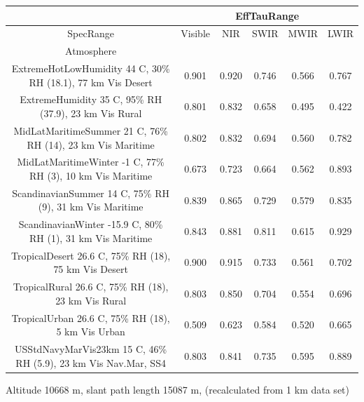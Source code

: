 \documentclass{workpackage}
\begin{document}
\begin{center}

\begin{footnotesize}

\begin{tabular}{|c|c|c|c|c|c|}
\hline
&\multicolumn{5}{|c|}{EffTauRange}\\\hline
SpecRange&Visible&NIR&SWIR&MWIR&LWIR\\\hline
Atmosphere&&&&&\\\hline
ExtremeHotLowHumidity 44 C, 30\% RH (18.1), 77 km Vis Desert&0.901&0.920&0.746&0.566&0.767\\\hline
ExtremeHumidity 35 C, 95\% RH (37.9), 23 km Vis Rural&0.801&0.832&0.658&0.495&0.422\\\hline
MidLatMaritimeSummer 21 C, 76\% RH (14), 23 km Vis Maritime&0.802&0.832&0.694&0.560&0.782\\\hline
MidLatMaritimeWinter -1 C, 77\% RH (3), 10 km Vis Maritime&0.673&0.723&0.664&0.562&0.893\\\hline
ScandinavianSummer 14 C, 75\% RH (9), 31 km Vis Maritime&0.839&0.865&0.729&0.579&0.835\\\hline
ScandinavianWinter -15.9 C, 80\% RH (1), 31 km Vis Maritime&0.843&0.881&0.811&0.615&0.929\\\hline
TropicalDesert 26.6 C, 75\% RH (18), 75 km Vis Desert&0.900&0.915&0.733&0.561&0.702\\\hline
TropicalRural 26.6 C, 75\% RH (18), 23 km Vis Rural&0.803&0.850&0.704&0.554&0.696\\\hline
TropicalUrban 26.6 C, 75\% RH (18), 5 km Vis Urban&0.509&0.623&0.584&0.520&0.665\\\hline
USStdNavyMarVis23km 15 C, 46\% RH (5.9), 23 km Vis Nav.Mar, SS4&0.803&0.841&0.735&0.595&0.889\\\hline

\end{tabular}
\end{footnotesize}
\end{center}


Altitude 10668 m, slant path length 15087 m, (recalculated from 1 km data set)
\end{document}
